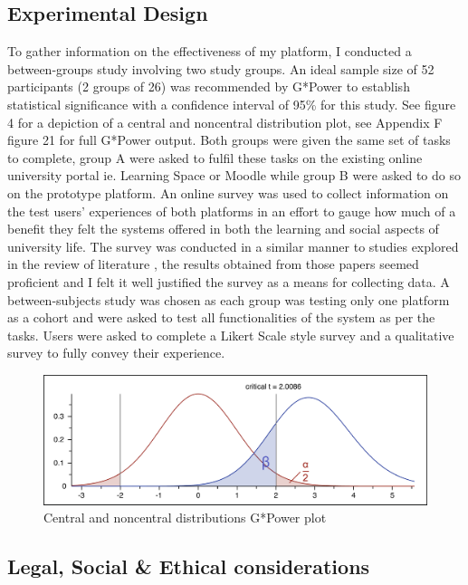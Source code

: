 \documentclass[lettersize,journal]{IEEEtran}
\begin{document}
        \subsection{Experimental Design}
        To gather information on the effectiveness of my platform, I conducted a between-groups study involving
	two study groups. An ideal sample size of 52 participants (2 groups of 26) was recommended by G*Power to establish statistical significance with a confidence interval of 95\%
	for this study. See figure 4 for a depiction of a central and noncentral distribution plot, see Appendix F figure 21 for full G*Power output.
	Both groups were given the same set of tasks to complete, group A were asked to fulfil
        these tasks on the existing online university portal ie. Learning Space or Moodle while group B were asked to 
        do so on the prototype platform. An online survey was used to collect information on the test users' experiences
        of both platforms in an effort to gauge how much of a benefit they felt the systems offered in both the
        learning and social aspects of university life. The survey was conducted in a similar manner to
        studies explored in the review of literature \cite{Liu2010}\cite{Baruah2012}\cite{Wang2011}\cite{Evans2014}\cite{Akram et al 2017},
        the results obtained from those papers seemed proficient and I felt it well justified the survey as a means for collecting data.
        A between-subjects study was chosen as each group was testing only one platform as a cohort and were asked to test all functionalities of
        the system as per the tasks. Users were asked to complete a Likert Scale style survey and a qualitative survey to fully convey their experience.
	        \begin{figure}[h!]
                \includegraphics[width=\linewidth]{images/gpowerplot.png}
                \caption{Central and noncentral distributions G*Power plot}
                \label{figure 3}
        \end{figure}
	\subsection{Legal, Social \& Ethical considerations}
\end{document}
